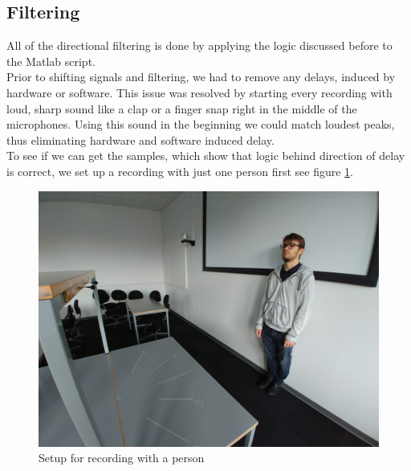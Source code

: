 \subsection{Filtering}
All of the directional filtering is done by applying the logic discussed before to the Matlab script.\\
Prior to shifting signals and filtering, we had to remove any delays, induced by hardware or software. This 
issue was resolved by starting every recording with loud, sharp sound like a clap or a finger snap right in 
the middle of the microphones. Using this sound in the beginning we could match loudest peaks, thus 
eliminating hardware and software induced delay. \\
To see if we can get the samples, which show that logic behind direction of delay is correct, we set up a 
recording with just one person first see figure \ref{fig:RanzvanRecSetup}.\\

\begin{figure}[htp]
	\centering
	\includegraphics[width=.\textwidth]{Illustrations/razvanWithSetup.jpg}
	\caption{Setup for recording with a person}
	\label{fig:RanzvanRecSetup}
\end{figure}

